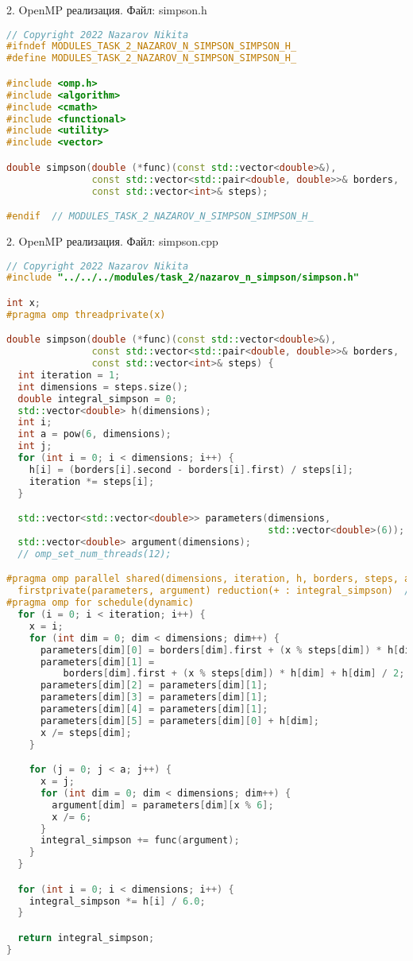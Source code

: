 \documentclass{report}
\begin{document}
\par 2. OpenMP реализация. Файл: simpson.h

\begin{lstlisting}[language=C++]
// Copyright 2022 Nazarov Nikita
#ifndef MODULES_TASK_2_NAZAROV_N_SIMPSON_SIMPSON_H_
#define MODULES_TASK_2_NAZAROV_N_SIMPSON_SIMPSON_H_

#include <omp.h>
#include <algorithm>
#include <cmath>
#include <functional>
#include <utility>
#include <vector>

double simpson(double (*func)(const std::vector<double>&),
               const std::vector<std::pair<double, double>>& borders,
               const std::vector<int>& steps);

#endif  // MODULES_TASK_2_NAZAROV_N_SIMPSON_SIMPSON_H_
\end{lstlisting}

\par 2. OpenMP реализация. Файл: simpson.cpp

\begin{lstlisting}[language=C++]
// Copyright 2022 Nazarov Nikita
#include "../../../modules/task_2/nazarov_n_simpson/simpson.h"

int x;
#pragma omp threadprivate(x)

double simpson(double (*func)(const std::vector<double>&),
               const std::vector<std::pair<double, double>>& borders,
               const std::vector<int>& steps) {
  int iteration = 1;
  int dimensions = steps.size();
  double integral_simpson = 0;
  std::vector<double> h(dimensions);
  int i;
  int a = pow(6, dimensions);
  int j;
  for (int i = 0; i < dimensions; i++) {
    h[i] = (borders[i].second - borders[i].first) / steps[i];
    iteration *= steps[i];
  }

  std::vector<std::vector<double>> parameters(dimensions,
                                              std::vector<double>(6));
  std::vector<double> argument(dimensions);
  // omp_set_num_threads(12);

#pragma omp parallel shared(dimensions, iteration, h, borders, steps, a) private(i, j) \
  firstprivate(parameters, argument) reduction(+ : integral_simpson)  // num_threads(12)
#pragma omp for schedule(dynamic)
  for (i = 0; i < iteration; i++) {
    x = i;
    for (int dim = 0; dim < dimensions; dim++) {
      parameters[dim][0] = borders[dim].first + (x % steps[dim]) * h[dim];
      parameters[dim][1] =
          borders[dim].first + (x % steps[dim]) * h[dim] + h[dim] / 2;
      parameters[dim][2] = parameters[dim][1];
      parameters[dim][3] = parameters[dim][1];
      parameters[dim][4] = parameters[dim][1];
      parameters[dim][5] = parameters[dim][0] + h[dim];
      x /= steps[dim];
    }

    for (j = 0; j < a; j++) {
      x = j;
      for (int dim = 0; dim < dimensions; dim++) {
        argument[dim] = parameters[dim][x % 6];
        x /= 6;
      }
      integral_simpson += func(argument);
    }
  }

  for (int i = 0; i < dimensions; i++) {
    integral_simpson *= h[i] / 6.0;
  }

  return integral_simpson;
}
\end{lstlisting}
\end{document}
